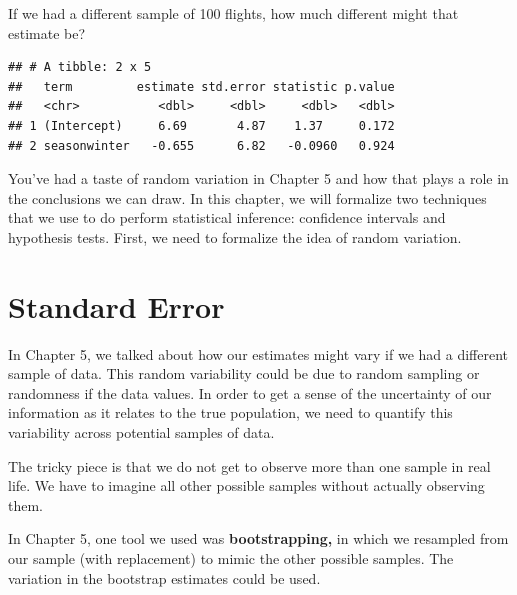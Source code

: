 \documentclass[
]{book}
\newenvironment{Shaded}{\begin{snugshade}}{\end{snugshade}}
\newcommand{\KeywordTok}[1]{\textcolor[rgb]{0.13,0.29,0.53}{\textbf{#1}}}
\newcommand{\NormalTok}[1]{#1}
\newcommand{\OperatorTok}[1]{\textcolor[rgb]{0.81,0.36,0.00}{\textbf{#1}}}
\newcommand{\StringTok}[1]{\textcolor[rgb]{0.31,0.60,0.02}{#1}}
\begin{document}
If we had a different sample of 100 flights, how much different might that estimate be?

\begin{Shaded}
\end{Shaded}

\begin{verbatim}
## # A tibble: 2 x 5
##   term         estimate std.error statistic p.value
##   <chr>           <dbl>     <dbl>     <dbl>   <dbl>
## 1 (Intercept)     6.69       4.87    1.37     0.172
## 2 seasonwinter   -0.655      6.82   -0.0960   0.924
\end{verbatim}

You've had a taste of random variation in Chapter 5 and how that plays a role in the conclusions we can draw. In this chapter, we will formalize two techniques that we use to do perform statistical inference: confidence intervals and hypothesis tests. First, we need to formalize the idea of random variation.

\hypertarget{standard-error}{%
\section{Standard Error}\label{standard-error}}

In Chapter 5, we talked about how our estimates might vary if we had a different sample of data. This random variability could be due to random sampling or randomness if the data values. In order to get a sense of the uncertainty of our information as it relates to the true population, we need to quantify this variability across potential samples of data.

The tricky piece is that we do not get to observe more than one sample in real life. We have to imagine all other possible samples without actually observing them.

In Chapter 5, one tool we used was \textbf{bootstrapping,} in which we resampled from our sample (with replacement) to mimic the other possible samples. The variation in the bootstrap estimates could be used.
\end{document}
